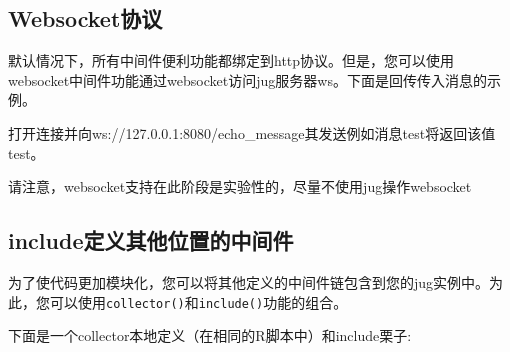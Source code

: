 \documentclass[]{book}
\newenvironment{Shaded}{\begin{snugshade}}{\end{snugshade}}
\newcommand{\KeywordTok}[1]{\textcolor[rgb]{0.13,0.29,0.53}{\textbf{#1}}}
\newcommand{\DecValTok}[1]{\textcolor[rgb]{0.00,0.00,0.81}{#1}}
\newcommand{\FloatTok}[1]{\textcolor[rgb]{0.00,0.00,0.81}{#1}}
\newcommand{\StringTok}[1]{\textcolor[rgb]{0.31,0.60,0.02}{#1}}
\newcommand{\ControlFlowTok}[1]{\textcolor[rgb]{0.13,0.29,0.53}{\textbf{#1}}}
\newcommand{\OperatorTok}[1]{\textcolor[rgb]{0.81,0.36,0.00}{\textbf{#1}}}
\newcommand{\ErrorTok}[1]{\textcolor[rgb]{0.64,0.00,0.00}{\textbf{#1}}}
\newcommand{\NormalTok}[1]{#1}
\begin{document}
\begin{Shaded}
\end{Shaded}

\subsection{Websocket协议}\label{websocket}

默认情况下，所有中间件便利功能都绑定到http协议。但是，您可以使用websocket中间件功能通过websocket访问jug服务器ws。下面是回传传入消息的示例。

\begin{Shaded}
\end{Shaded}

打开连接并向ws://127.0.0.1:8080/echo\_message其发送例如消息test将返回该值test。

请注意，websocket支持在此阶段是实验性的，尽量不使用jug操作websocket

\subsection{include定义其他位置的中间件}\label{include}

为了使代码更加模块化，您可以将其他定义的中间件链包含到您的jug实例中。为此，您可以使用\texttt{collector()}和\texttt{include()}功能的组合。

下面是一个collector本地定义（在相同的R脚本中）和include栗子:
\end{document}
